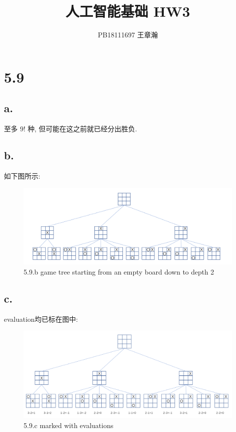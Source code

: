 \documentclass[UTF8]{article}
\title{人工智能基础 HW3}
\author{PB18111697 王章瀚}
\begin{document}
\maketitle
\section*{5.9}
\subsection*{a.}
至多 $9!$ 种, 但可能在这之前就已经分出胜负.
\subsection*{b.}
如下图所示:
\begin{figure}[H]
	\centering
	\includegraphics[width=\linewidth]{image/5.9.tree.png}
	\caption{5.9.b game tree starting from an empty board down to depth 2}
\end{figure}\par
\subsection*{c.}
evaluation均已标在图中:
\begin{figure}[H]
	\centering
	\includegraphics[width=\linewidth]{image/5.9.tree_marked.png}
	\caption{5.9.c marked with evaluations}
\end{figure}\par
\end{document}
